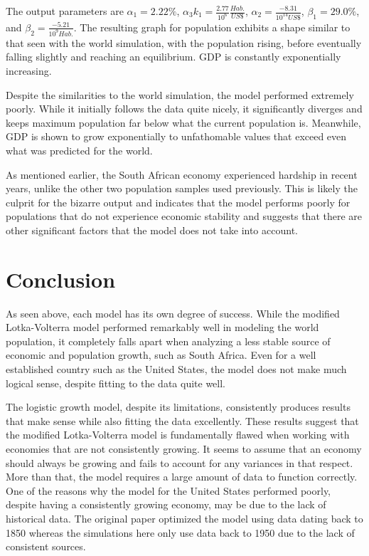 \documentclass[a4paper]{article}
\begin{document}
The output parameters are $\alpha_1 = 2.22\%$, $\alpha_3 k_1 = \frac{2.77}{10^{6}}\frac{Hab.}{US \$}$, $\alpha_2 = \frac{-8.31}{10^{14} US\$}$, $\beta_1 = 29.0\%$, and $\beta_2 = \frac{-5.21}{10^{9} Hab.}$. The resulting graph for population exhibits a shape similar to that seen with the world simulation, with the population rising, before eventually falling slightly and reaching an equilibrium. GDP is constantly exponentially increasing.

Despite the similarities to the world simulation, the model performed extremely poorly. While it initially follows the data quite nicely, it significantly diverges and keeps maximum population far below what the current population is. Meanwhile, GDP is shown to grow exponentially to unfathomable values that exceed even what was predicted for the world.

As mentioned earlier, the South African economy experienced hardship in recent years, unlike the other two population samples used previously. This is likely the culprit for the bizarre output and indicates that the model performs poorly for populations that do not experience economic stability and suggests that there are other significant factors that the model does not take into account.

\section{Conclusion}

As seen above, each model has its own degree of success. While the modified Lotka-Volterra model performed remarkably well in modeling the world population, it completely falls apart when analyzing a less stable source of economic and population growth, such as South Africa. Even for a well established country such as the United States, the model does not make much logical sense, despite fitting to the data quite well. 

The logistic growth model, despite its limitations, consistently produces results that make sense while also fitting the data excellently. These results suggest that the modified Lotka-Volterra model is fundamentally flawed when working with economies that are not consistently growing. It seems to assume that an economy should always be growing and fails to account for any variances in that respect. More than that, the model requires a large amount of data to function correctly. One of the reasons why the model for the United States performed poorly, despite having a consistently growing economy, may be due to the lack of historical data. The original paper optimized the model using data dating back to 1850 whereas the simulations here only use data back to 1950 due to the lack of consistent sources. 
\end{document}
